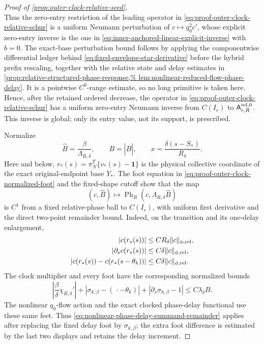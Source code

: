 \begin{proof}[Proof of \cref{prop:outer-clock-relative-seed}]
\begin{equation}
\end{equation}
Thus the zero-entry restriction of the leading operator in
\cref{eq:proof-outer-clock-relative-schur} is a uniform Neumann
perturbation of \(c\mapsto q_0^2c'\), whose explicit zero-entry inverse
is the one in
\cref{eq:inner-anchored-linear-explicit-inverse} with \(b=0\).
The exact-base perturbation bound
follows by applying the componentwise differential ledger behind
\cref{eq:fixed-envelope-star-derivative} before the hybrid prefix
rescaling, together with the relative state and delay estimates in
\cref{prop:relative-structured-phase-response,%
lem:nonlinear-reduced-flow-phase-delay}.  It is a pointwise
\(C^0\)-range estimate, so no long primitive is taken here.  Hence,
after the retained ordered decrease, the operator in
\cref{eq:proof-outer-clock-relative-schur} has a uniform zero-entry
Neumann inverse from \(C(I_r)\) to
\(\mathsf A_{r,R}^{\rm rel,0}\).  This inverse is global; only its entry
value, not its support, is prescribed.

Normalize
\[
 \widehat B=\frac{\beta}{\Lambda_{R,\delta}},\qquad
 B=|\widehat B|,\qquad
 x=\frac{\delta(s-S_*)}{R_\delta}.
\]
Here and below, \(r_*(s)=\pi_N^T\{v_*(s)-\mathbf1\}\) is the physical
collective coordinate of the exact original-endpoint base \(Y_*\).
The foot equation in
\cref{eq:proof-outer-clock-normalized-foot} and the fixed-shape cutoff
show that the map
\[
 (c,\widehat B)\longmapsto
 \operatorname{Ph}_R(c,\Lambda_{R,\delta}\widehat B)
\]
is \(C^1\) from a fixed relative-phase ball to \(C(I_r)\), with uniform
first derivative and the direct two-point remainder bound.  Indeed,
on the transition and its one-delay enlargement,
\begin{align}
 |c(r_*(s))|
 &\le CR_\delta\|c\|_{\phi,\rm rel},\notag\\
 |\partial_sc(r_*(s))|
 &\le C\delta\|c\|_{\phi,\rm rel},\notag\\
 |c(r_*(s))-c(r_*(s-\theta_k))|
 &\le C\delta\|c\|_{\phi,\rm rel}.              \label{eq:proof-outer-clock-relative-seed-ledger}
\end{align}
The clock multiplier and every foot have the corresponding normalized
bounds
\begin{equation}
 \left|\frac{\beta}{\delta}\chi_{R,\delta}'\right|
 +|\sigma_{k,\beta}-(\,\cdot-\theta_k)|
 +|\partial_s\sigma_{k,\beta}-1|
 \le C\lambda_\delta B.                        \label{eq:proof-outer-clock-relative-clock-ledger}
\end{equation}
The nonlinear \(q_0\)-flow action and the exact clocked phase-delay
functional use these same feet.  Thus
\cref{eq:nonlinear-phase-delay-summand-remainder} applies after replacing
the fixed delay foot by \(\sigma_{k,\beta}\); the extra foot difference
is estimated by the last two displays and retains the delay increment.


\end{proof}
